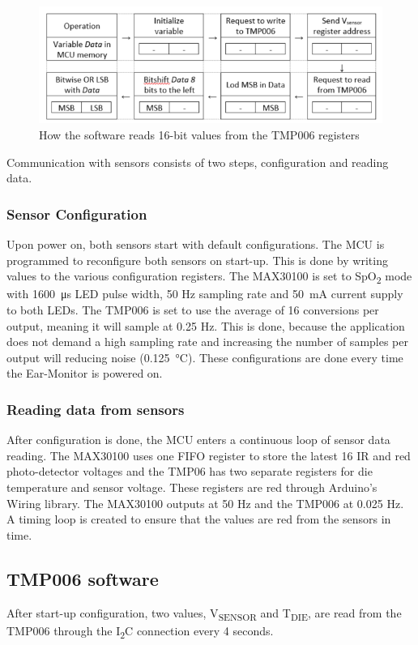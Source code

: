 \begin{figure}[H]
   \centering
   \includegraphics[scale=1]{figs/I2C_Read.png}
   \caption{How the software reads 16-bit values from the TMP006 registers}
   \label{fig:I2C_Read}
\end{figure}

Communication with sensors consists of two steps, configuration and reading data.

\subsubsection{Sensor Configuration}
Upon power on, both sensors start with default configurations. The MCU is programmed to reconfigure both sensors on start-up. This is done by writing values to the various configuration registers.
The MAX30100 is set to SpO\textsubscript{2} mode with \SI{1600}{\micro\second} LED pulse width, 50 Hz sampling rate and \SI{50}{\milli\ampere} current supply to both LEDs. The TMP006 is set to use the average of 16 conversions per output, meaning it will sample at 0.25 Hz. This is done, because the application does not demand a high sampling rate and increasing the number of samples per output will reducing noise (\SI{0.125}{\celsius}). These configurations are done every time the Ear-Monitor is powered on.

\subsubsection{Reading data from sensors}
After configuration is done, the MCU enters a continuous loop of sensor data reading. The MAX30100 uses one FIFO register to store the latest 16 IR and red photo-detector voltages and the TMP06 has two separate registers for die temperature and sensor voltage. These registers are red through Arduino's Wiring library. The MAX30100 outputs at 50 Hz and the TMP006 at 0.025 Hz. A timing loop is created to ensure that the values are red from the sensors in time.

\subsection{TMP006 software}
After start-up configuration, two values, V\textsubscript{SENSOR} and T\textsubscript{DIE}, are read from the TMP006 through the I\textsubscript{2}C connection every 4 seconds.

